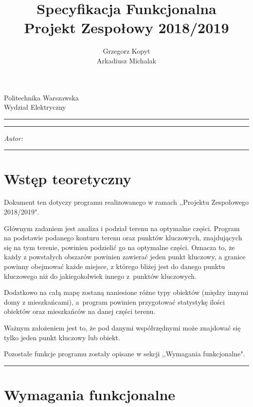 \documentclass[a4paper,11pt]{article}
\author{Grzegorz Kopyt \\ Arkadiusz Michalak}
\title{Specyfikacja Funkcjonalna\\Projekt Zespołowy 2018/2019}
\makeatletter
\newcommand{\linia}{\rule{\linewidth}{0.4mm}}
\renewcommand{\maketitle}{\begin{titlepage}
    \vspace*{2cm}
    \begin{center}\LARGE
    Politechnika Warszawska\\
    Wydział Elektryczny\\
    \end{center}
    \vspace{5cm}
    \noindent\linia
    \begin{center}
      \LARGE \textsc{\@title}
         \end{center}
     \linia
    \vspace{0.5cm}
    \begin{flushright}
    \begin{minipage}{5cm}
    \textit{Autor:}\\
    \normalsize \textsc{\@author} \par
    \end{minipage}
    \vspace{5cm}
     \end{flushright}
    \vspace*{\stretch{6}}
    \begin{center}
    \@date
    \end{center}
  \end{titlepage}
}
\makeatother
\begin{document}
\maketitle

\tableofcontents
\vspace{1cm}
\noindent\linia
\section{Wstęp teoretyczny}
Dokument ten dotyczy programu realizowanego w ramach ,,Projektu Zespołowego 2018/2019".

Głównym zadaniem jest analiza i podział terenu na optymalne części. Program na podstawie podanego konturu terenu oraz punktów kluczowych, znajdujących się na tym terenie, powinien podzielić go na optymalne części. Oznacza to, że każdy z powstałych obszarów powinien zawierać jeden punkt kluczowy, a granice powinny obejmować każde miejsce, z którego bliżej jest do danego punktu kluczowego niż do jakiegokolwiek innego z~punktów kluczowych.

Dodatkowo na całą mapę zostaną naniesione różne typy obiektów (między innymi domy z mieszkańcami), a~program powinien przygotować statystykę ilości obiektów oraz mieszkańców na danej części terenu.

Ważnym założeniem jest to, że pod danymi współrzędnymi może znajdować się tylko jeden punkt kluczowy lub obiekt.

Pozostałe funkcje programu zostały opisane w sekcji ,,Wymagania funkcjonalne".

\noindent\linia
\section{Wymagania funkcjonalne}
\end{document}

